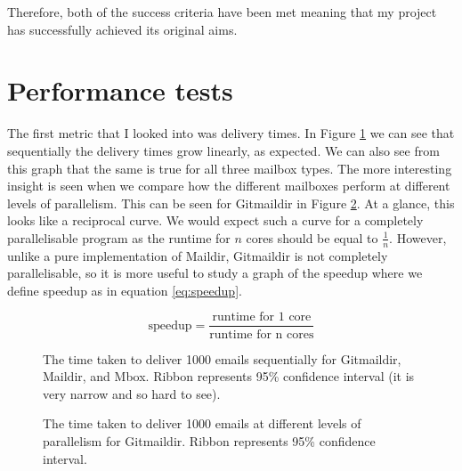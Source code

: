 Therefore, both of the success criteria have been met meaning that my project has successfully achieved its original aims.

\section{Performance tests}

The first metric that I looked into was delivery times. In Figure \ref{fig:tds_combined} we can see that sequentially the delivery times grow linearly, as expected. We can also see from this graph that the same is true for all three mailbox types. The more interesting insight is seen when we compare how the different mailboxes perform at different levels of parallelism. This can be seen for Gitmaildir in Figure \ref{fig:tdpp}. At a glance, this looks like a reciprocal curve. We would expect such a curve for a completely parallelisable program as the runtime for $n$ cores should be equal to $\frac{1}{n}$. However, unlike a pure implementation of Maildir, Gitmaildir is not completely parallelisable, so it is more useful to study a graph of the speedup where we define speedup as in equation \ref{eq:speedup}.

\begin{equation} \label{eq:speedup}
\textrm{speedup} = \frac{\textrm{runtime for 1 core}}{\textrm{runtime for n cores}}
\end{equation}

\begin{figure}[h]
    \centering
    
    \caption{The time taken to deliver 1000 emails sequentially for Gitmaildir, Maildir, and Mbox. Ribbon represents 95\% confidence interval (it is very narrow and so hard to see).}
    \label{fig:tds_combined}
\end{figure}


\begin{figure}[h]
    \centering
    
    \caption{The time taken to deliver 1000 emails at different levels of parallelism for Gitmaildir. Ribbon represents 95\% confidence interval.}
    \label{fig:tdpp}
\end{figure}

